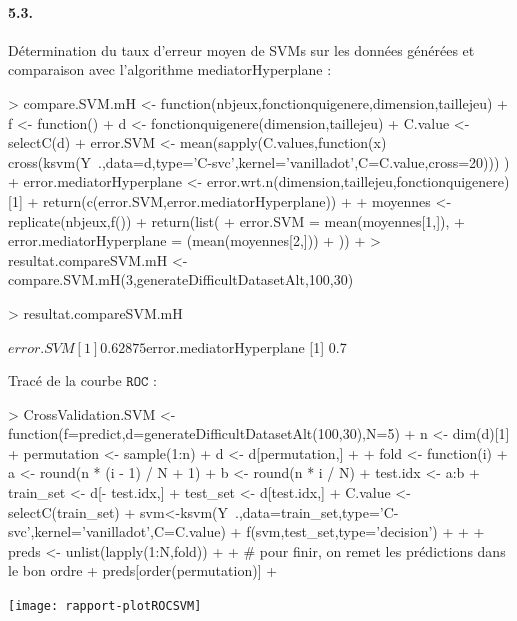 \documentclass{article}
\begin{document}
\paragraph{5.3.}Détermination du taux d'erreur moyen de SVMs sur les 
données générées et comparaison avec l'algorithme mediatorHyperplane :
\begin{Schunk}
\begin{Sinput}
> compare.SVM.mH <- function(nbjeux,fonctionquigenere,dimension,taillejeu) {
+ 	f <- function() {
+ 		d <- fonctionquigenere(dimension,taillejeu)
+ 		C.value <- selectC(d)
+ 		error.SVM <- mean(sapply(C.values,function(x) cross(ksvm(Y~.,data=d,type='C-svc',kernel='vanilladot',C=C.value,cross=20))) )
+ 		error.mediatorHyperplane <- error.wrt.n(dimension,taillejeu,fonctionquigenere)[1]
+ 		return(c(error.SVM,error.mediatorHyperplane))
+ 	}
+ 	moyennes <- replicate(nbjeux,f())
+ 	return(list(
+ 		error.SVM = mean(moyennes[1,]),
+ 		error.mediatorHyperplane = (mean(moyennes[2,]))
+ 	))
+ }
> resultat.compareSVM.mH <- compare.SVM.mH(3,generateDifficultDatasetAlt,100,30)
\end{Sinput}
\end{Schunk}
\begin{Schunk}
\begin{Sinput}
> resultat.compareSVM.mH
\end{Sinput}
\begin{Soutput}
$error.SVM
[1] 0.62875

$error.mediatorHyperplane
[1] 0.7
\end{Soutput}
\end{Schunk}
Tracé de la courbe $\mathtt{ROC}$ :
\begin{Schunk}
\begin{Sinput}
> CrossValidation.SVM <- function(f=predict,d=generateDifficultDatasetAlt(100,30),N=5) {
+     n <- dim(d)[1]
+     permutation <- sample(1:n)
+     d <- d[permutation,]
+ 
+     fold <- function(i) {
+         a <- round(n * (i - 1) / N + 1)
+         b <- round(n * i / N)
+         test.idx <- a:b
+         train_set <- d[- test.idx,]
+         test_set <- d[test.idx,]
+         C.value <- selectC(train_set)
+         svm<-ksvm(Y~.,data=train_set,type='C-svc',kernel='vanilladot',C=C.value) 
+         f(svm,test_set,type='decision')
+     }
+ 
+     preds <- unlist(lapply(1:N,fold))
+     
+     # pour finir, on remet les prédictions dans le bon ordre
+     preds[order(permutation)]
+ }
\end{Sinput}
\end{Schunk}
\begin{Schunk}
\end{Schunk}
\texttt{[image: rapport-plotROCSVM]}
\end{document}
